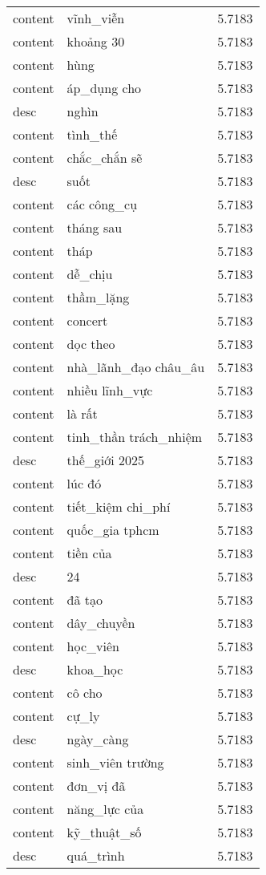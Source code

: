 \documentclass{article}
\begin{document}
\begin{tabular}{lll}
content & vĩnh\_viễn & 5.7183\\
content & khoảng 30 & 5.7183\\
content & hùng & 5.7183\\
content & áp\_dụng cho & 5.7183\\
desc & nghìn & 5.7183\\
content & tình\_thế & 5.7183\\
content & chắc\_chắn sẽ & 5.7183\\
desc & suốt & 5.7183\\
content & các công\_cụ & 5.7183\\
content & tháng sau & 5.7183\\
content & tháp & 5.7183\\
content & dễ\_chịu & 5.7183\\
content & thầm\_lặng & 5.7183\\
content & concert & 5.7183\\
content & dọc theo & 5.7183\\
content & nhà\_lãnh\_đạo châu\_âu & 5.7183\\
content & nhiều lĩnh\_vực & 5.7183\\
content & là rất & 5.7183\\
content & tinh\_thần trách\_nhiệm & 5.7183\\
desc & thế\_giới 2025 & 5.7183\\
content & lúc đó & 5.7183\\
content & tiết\_kiệm chi\_phí & 5.7183\\
content & quốc\_gia tphcm & 5.7183\\
content & tiền của & 5.7183\\
desc & 24 & 5.7183\\
content & đã tạo & 5.7183\\
content & dây\_chuyền & 5.7183\\
content & học\_viên & 5.7183\\
desc & khoa\_học & 5.7183\\
content & cô cho & 5.7183\\
content & cự\_ly & 5.7183\\
desc & ngày\_càng & 5.7183\\
content & sinh\_viên trường & 5.7183\\
content & đơn\_vị đã & 5.7183\\
content & năng\_lực của & 5.7183\\
content & kỹ\_thuật\_số & 5.7183\\
desc & quá\_trình & 5.7183\\

\end{tabular}
\end{document}
